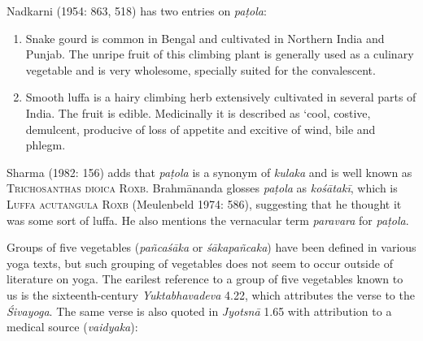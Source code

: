 \begin{ekdosis}
\begin{philcomm}[hp01_062]
Nadkarni (1954: 863, 518) has two entries on \emph{paṭola}:
\begin{enumerate}
\item Snake gourd is common in Bengal and cultivated in Northern India and Punjab. The unripe fruit of this climbing plant is generally used as a culinary vegetable and is very wholesome, specially suited for the convalescent.

\item Smooth luffa is a hairy climbing herb extensively cultivated in several parts of India. The fruit is edible. Medicinally it is described as `cool, costive, demulcent, producive of loss of appetite and excitive of wind, bile and phlegm.
\end{enumerate}
Sharma (1982: 156) adds that \emph{paṭola} is a synonym of \emph{kulaka} and is well known as \textsc{Trichosanthas dioica Roxb.} Brahmānanda glosses \emph{paṭola} as \emph{kośātakī}, which is \textsc{Luffa acutangula Roxb} (Meulenbeld 1974: 586), suggesting that he thought it was some sort of luffa. He also mentions the vernacular term \emph{paravara} for \emph{paṭola}.

Groups of five vegetables (\emph{pañcaśāka} or \emph{śākapañcaka}) have been defined in various yoga texts, but such grouping of vegetables does not seem to occur outside of literature on yoga. The earilest reference to a group of five vegetables known to us is the sixteenth-century \emph{Yuktabhavadeva} 4.22, which attributes the verse to the \emph{Śivayoga}. The same verse is also quoted in \emph{Jyotsnā} 1.65 with attribution to a medical source (\emph{vaidyaka}):


\end{philcomm}
\end{ekdosis}
